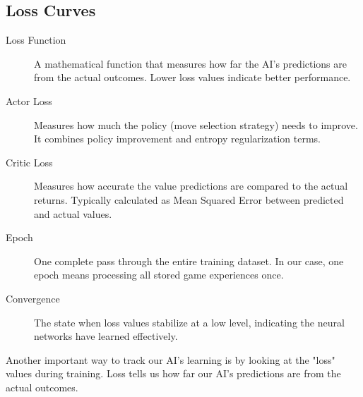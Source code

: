 \documentclass[11pt]{article}
\newenvironment{termbox}[1]
  {\begin{tcolorbox}[colback=blue!5!white,colframe=blue!75!black,title=#1,fonttitle=\bfseries]}
  {\end{tcolorbox}}
\begin{document}
\subsection{Loss Curves}

\begin{termbox}{Key Technical Terms in Loss Analysis}
\begin{description}
    \item[Loss Function] A mathematical function that measures how far the AI's predictions are from the actual outcomes. Lower loss values indicate better performance.
    
    \item[Actor Loss] Measures how much the policy (move selection strategy) needs to improve. It combines policy improvement and entropy regularization terms.
    
    \item[Critic Loss] Measures how accurate the value predictions are compared to the actual returns. Typically calculated as Mean Squared Error between predicted and actual values.
    
    \item[Epoch] One complete pass through the entire training dataset. In our case, one epoch means processing all stored game experiences once.
    
    \item[Convergence] The state when loss values stabilize at a low level, indicating the neural networks have learned effectively.
\end{description}
\end{termbox}

Another important way to track our AI's learning is by looking at the "loss" values during training. Loss tells us how far our AI's predictions are from the actual outcomes.
\end{document}
